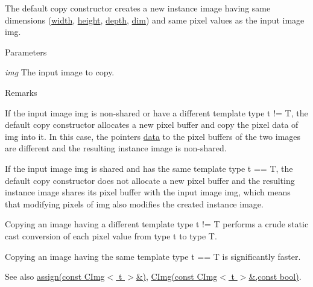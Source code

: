 The default copy constructor creates a new instance image having same dimensions (\hyperlink{structcimg__library_1_1_c_img_a5fb74a7776210bb99fd6755319ade13f}{width}, \hyperlink{structcimg__library_1_1_c_img_a30d575fd18ae525e507315de71b4806a}{height}, \hyperlink{structcimg__library_1_1_c_img_a982d5d1e153477adf7f851106fe8ee3a}{depth}, \hyperlink{structcimg__library_1_1_c_img_ac9648dfe0a26d58e6e0030a3dbca234e}{dim}) and same pixel values as the input image {\ttfamily img}. 
\begin{DoxyParams}{Parameters}
\item[{\em img}]The input image to copy. \end{DoxyParams}
\begin{DoxyRemark}{Remarks}

\begin{DoxyItemize}
\item If the input image {\ttfamily img} is non-\/shared or have a different template type {\ttfamily t} != {\ttfamily T}, the default copy constructor allocates a new pixel buffer and copy the pixel data of {\ttfamily img} into it. In this case, the pointers \hyperlink{structcimg__library_1_1_c_img_a54f252b86f19b2217aef3ec9e1e2e013}{data} to the pixel buffers of the two images are different and the resulting instance image is non-\/shared.
\item If the input image {\ttfamily img} is shared and has the same template type {\ttfamily t} == {\ttfamily T}, the default copy constructor does not allocate a new pixel buffer and the resulting instance image shares its pixel buffer with the input image {\ttfamily img}, which means that modifying pixels of {\ttfamily img} also modifies the created instance image.
\item Copying an image having a different template type {\ttfamily t} != {\ttfamily T} performs a crude static cast conversion of each pixel value from type {\ttfamily t} to type {\ttfamily T}.
\item Copying an image having the same template type {\ttfamily t} == {\ttfamily T} is significantly faster. 
\end{DoxyItemize}
\end{DoxyRemark}
\begin{DoxySeeAlso}{See also}
\hyperlink{structcimg__library_1_1_c_img_ae8018950a740a3e76878727fdcb03076}{assign(const CImg$<$ t $>$\&)}, \hyperlink{structcimg__library_1_1_c_img_a91826df0d3bf6569c39ae07705ea43d4}{CImg(const CImg$<$ t $>$\&,const bool)}. 
\end{DoxySeeAlso}
